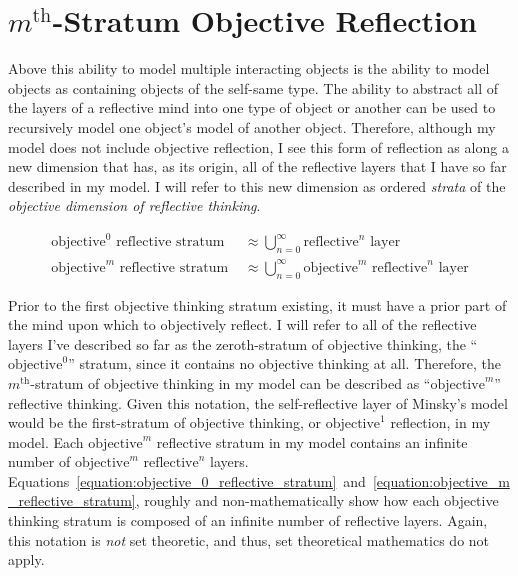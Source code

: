 \section{$m^\text{th}$-Stratum Objective Reflection}

Above this ability to model multiple interacting objects is the
ability to model objects as containing objects of the self-same type.
The ability to abstract all of the layers of a reflective mind into
one type of object or another can be used to recursively model one
object's model of another object.  Therefore, although my model does
not include objective reflection, I see this form of reflection as
along a new dimension that has, as its origin, all of the reflective
layers that I have so far described in my model.  I will refer to this
new dimension as ordered \emph{strata} of the \emph{objective
  dimension of reflective thinking}.

\begin{align}
\label{equation:objective_0_reflective_stratum}
\text{objective}^0\text{ reflective stratum } &{\approx} \bigcup_{n=0}^{\infty}{\text{reflective}^n\text{ layer}} \\
\label{equation:objective_m_reflective_stratum}
\text{objective}^m\text{ reflective stratum } &{\approx} \bigcup_{n=0}^{\infty}{\text{objective}^m\text{ reflective}^n\text{ layer}}
\end{align}

Prior to the first objective thinking stratum existing, it must have a
prior part of the mind upon which to objectively reflect.  I will
refer to all of the reflective layers I've described so far as the
zeroth-stratum of objective thinking, the ``$\text{objective}^0$''
stratum, since it contains no objective thinking at all.  Therefore,
the $m^\text{th}$-stratum of objective thinking in my model can be
described as ``$\text{objective}^m$'' reflective thinking.  Given this
notation, the self-reflective layer of Minsky's model would be the
first-stratum of objective thinking, or $\text{objective}^1$ reflection,
in my model.  Each $\text{objective}^m$ reflective stratum in my model
contains an infinite number of $\text{objective}^m\text{ reflective}^n$
layers.
Equations~\ref{equation:objective_0_reflective_stratum}~and~\ref{equation:objective_m_reflective_stratum},
roughly and non-mathematically show how each objective thinking
stratum is composed of an infinite number of reflective layers.
Again, this notation is \emph{not} set theoretic, and thus, set
theoretical mathematics do not apply.

